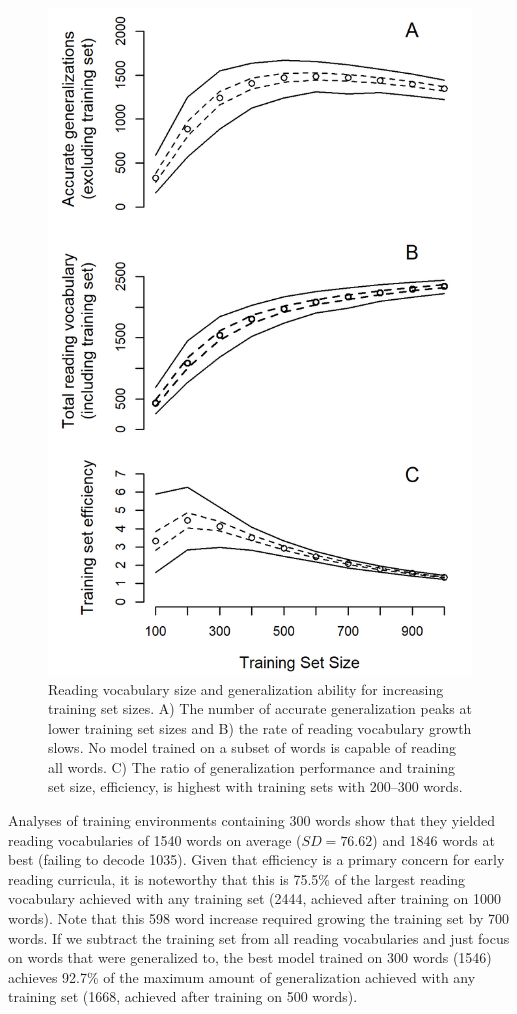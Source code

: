 \documentclass[10pt,letterpaper]{article}
\begin{document}
\begin{figure}[t]
	\includegraphics[width=0.9\columnwidth]{figures/generalization_by_setsize.png}

	\caption{Reading vocabulary size and generalization ability for increasing training set sizes. A) The number of accurate generalization peaks at lower training set sizes and B) the rate of reading vocabulary growth slows. No model trained on a subset of words is capable of reading all words. C) The ratio of generalization performance and training set size, efficiency, is highest with training sets with 200--300 words.}
	
	\label{gen_by_setsize}
\end{figure}

Analyses of training environments containing 300 words show that they yielded reading vocabularies of 1540 words on average ($SD = 76.62$) and 1846 words at best (failing to decode 1035). Given that efficiency is a primary concern for early reading curricula, it is noteworthy that this is 75.5\% of the largest reading vocabulary achieved with any training set (2444, achieved after training on 1000 words). Note that this 598 word increase required growing the training set by 700 words. If we subtract the training set from all reading vocabularies and just focus on words that were generalized to, the best model trained on 300 words (1546) achieves 92.7\% of the maximum amount of generalization achieved with any training set (1668, achieved after training on 500 words).
\end{document}
